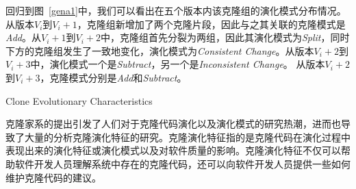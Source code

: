 回归到图~\ref{gena1}中，我们可以看出在五个版本内该克隆组的演化模式分布情况。从版本\emph{$V_i$}到{\em $V_i+1$}，克隆组新增加了两个克隆片段，因此与之其关联的克隆模式是\emph{Add}。从\emph{$V_i+1$}到{\em $V_i+2$}中，克隆组首先分裂为两组，因此其演化模式为\emph{Split}，同时下方的克隆组发生了一致地变化，演化模式为\emph{Consistent Change}。从版本\emph{$V_i+2$}到{\em $V_i+3$}中，演化模式一个是\emph{Subtract}，另一个是\emph{Inconsistent Change}。 从版本\emph{$V_i+2$}到\emph{$V_i+ 3$}，克隆模式分别是\emph{Add}和\emph{Subtract}。

{Clone Evolutionary Characteristics}

克隆家系的提出引发了人们对于克隆代码演化以及演化模式的研究热潮，进而也导致了大量的分析克隆演化特征的研究。克隆演化特征指的是克隆代码在演化过程中表现出来的演化特征或演化模式以及对软件质量的影响。克隆演化特征不仅可以帮助软件开发人员理解系统中存在的克隆代码，还可以向软件开发人员提供一些如何维护克隆代码的建议。




